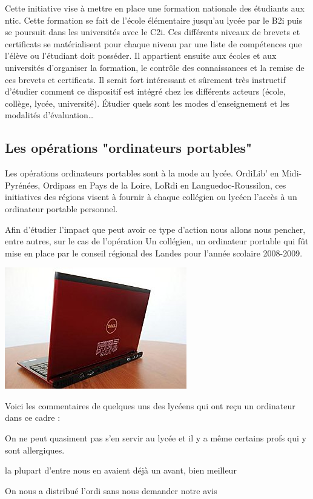 Cette initiative vise à mettre en place une formation nationale des
étudiants aux \gls{ntic}\cite{b2i_c2i}. Cette formation se fait de l'école élémentaire
jusqu'au lycée par le B2i puis se poursuit dans les universités avec
le C2i. Ces différents niveaux de brevets et certificats se
matérialisent pour chaque niveau par une liste de compétences que
l'élève ou l'étudiant doit posséder. Il appartient ensuite aux écoles
et aux universités d'organiser la formation, le contrôle des
connaissances et la remise de ces brevets et certificats. Il serait
fort intéressant et sûrement très instructif d'étudier comment ce
dispositif est intégré chez les différents acteurs (école, collège,
lycée, université). Étudier quels sont les modes d'enseignement et
les modalités d'évaluation\ldots

\subsection{Les opérations "ordinateurs portables"}

Les opérations \og{}ordinateurs portables\fg{} sont à la mode au
lycée. OrdiLib' en Midi-Pyrénées, Ordipass en Pays de la Loire, LoRdi
en Languedoc-Roussilon, ces initiatives des régions visent à fournir à
chaque collégien ou lycéen l'accès à un ordinateur portable personnel.

Afin d'étudier l'impact que peut avoir ce type d'action nous allons
nous pencher, entre autres, sur le cas de l'opération \og{}Un collégien, un
ordinateur portable\fg{} qui fût mise en place par le conseil régional
des Landes pour l'année scolaire 2008-2009. %
\cite{portables35}
\cite{portables60}
\cite{portables40}

\begin{center}
\includegraphics[]{../resources/illustrations/lordi}
\end{center}

Voici les commentaires de quelques uns des lycéens qui ont reçu un ordinateur dans ce cadre :\\
\begin{coolquote}
  On ne peut quasiment pas s'en servir au lycée et il y a même certains profs qui y sont allergiques.
  \end{coolquote}
  \begin{coolquote}
    la plupart d’entre nous en avaient déjà un avant, bien meilleur
  \end{coolquote}
    \begin{coolquote}
  On nous a distribué l’ordi sans nous demander notre avis
  \end{coolquote}

